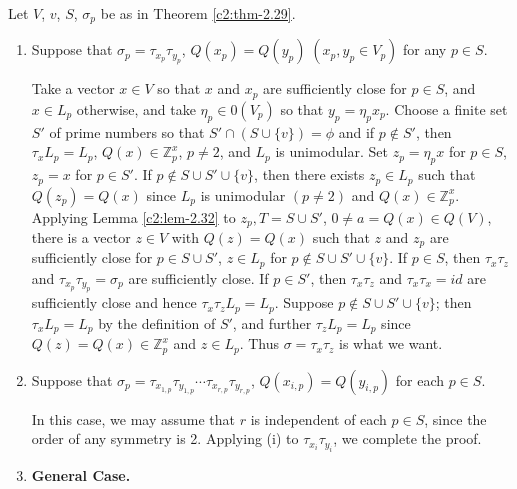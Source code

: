 Let $V$, $v$, $S$, $\sigma_p$ be as in Theorem \ref{c2:thm-2.29}.
\begin{enumerate}
\renewcommand{\theenumi}{\roman{enumi}}
\renewcommand{\labelenumi}{(\theenumi)}
\item Suppose that $\sigma_p = \tau_{x_p} \tau_{y_p}$, $Q(x_p) =
  Q(y_p) \; (x_p, y_p \in V_p)$ for any $p\in S$.

Take a vector $x\in V$ so that $x$ and $x_p$ are sufficiently
close for $p\in S$, and $x\in L_p$ otherwise, and take
$\eta_p \in 0(V_p)$ so that $y_p=\eta_p x_p$. Choose a finite
set $S'$ of prime numbers so that $S'\cap (S\cup \{v\})=\phi$ and if
$p\not\in S'$, then $\tau_x L_p =L_p$, $Q(x)\in
\mathbb{Z}^x_p$, $p\neq 2$, and $L_p$ is unimodular. Set
$z_p=\eta_px$ for $p\in S$, $z_p=x$ for $p\in S'$. If
$p \not\in S \cup S' \cup \{v\}$, then there exists $z_p \in
L_p$ such that $Q(z_p)=Q(x)$ since $L_p$ is unimodular $(p\neq 2)$ and
$Q(x)\in \mathbb{Z}^x_p$. Applying Lemma \ref{c2:lem-2.32} to $z_p,
T=S\cup S'$, $0\neq a=Q(x)\in Q(V)$, there is a vector
$z\in V$ with $Q(z)=Q(x)$ such that $z$ and $z_p$ are
sufficiently close for $p\in S \cup S'$, $z\in L_p$
for $p\not\in S \cup S'\cup \{v\}$. If \pageoriginale $p\in
S$, then $\tau_x \tau_z$ and $\tau_{x_p} \tau_{y_p} = \sigma_p$ are
sufficiently close. If $p\in S'$, then $\tau_x \tau_z$ and
$\tau_x \tau_x = id$ are sufficiently close and hence $\tau_x \tau_z
L_p = L_p$. Suppose $p\not\in S \cup S'\cup \{v\}$; then $\tau_x
L_p=L_p$ by the definition of $S'$, and further $\tau_z L_p=L_p$ since
$Q(z)=Q(x)\in \mathbb{Z}^x_p$ and $z\in
L_p$. Thus $\sigma =\tau_x \tau_z$ is what we want.

\item Suppose that $\sigma_p = \tau_{x_{1,p}} \tau_{y_{1,p}} \cdots
  \tau_{x_{r,p}} \tau_{y_{r,p}}$, $Q(x_{i,p}) = Q(y_{i,p})$ for each
  $p\in S$. 

In this case, we may assume that $r$ is independent of each
$p\in S$, since the order of any symmetry is 2. Applying (i)
to $\tau_{x_i} \tau_{y_i}$, we complete the proof.

\item 
\noindent
\textbf{General Case.}


\end{enumerate}

